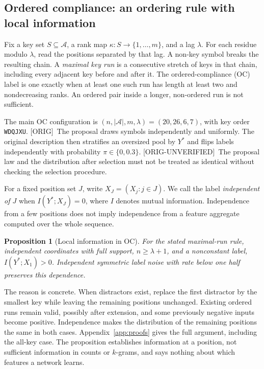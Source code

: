 \documentclass[10pt]{article}
\newcommand{\prov}[1]{{\color{black!65}\scriptsize[#1]}}
\newcommand{\orig}{\prov{ORIG}}
\newcommand{\ou}{\prov{ORIG-UNVERIFIED}}
\newtheorem{proposition}{Proposition}
\begin{document}
\subsection{Ordered compliance: an ordering rule with local information}
Fix a key set $S\subseteq\mathcal A$, a rank map $\kappa:S\to\{1,\ldots,m\}$, and a lag $\lambda$. For each residue modulo $\lambda$, read the positions separated by that lag. A non-key symbol breaks the resulting chain. A \emph{maximal key run} is a consecutive stretch of keys in that chain, including every adjacent key before and after it. The ordered-compliance (OC) label is one exactly when at least one such run has length at least two and nondecreasing ranks. An ordered pair inside a longer, non-ordered run is not sufficient.

The main OC configuration is $(n,|\mathcal A|,m,\lambda)=(20,26,6,7)$, with key order \texttt{WDQJXU}. \orig\ The proposal draws symbols independently and uniformly. The original description then stratifies an oversized pool by $Y^*$ and flips labels independently with probability $\pi\in\{0,0.3\}$. \ou\ The proposal law and the distribution after selection must not be treated as identical without checking the selection procedure.

For a fixed position set $J$, write $X_J=(X_j:j\in J)$. We call the label \emph{independent of $J$} when $I(Y^*;X_J)=0$, where $I$ denotes mutual information. Independence from a few positions does not imply independence from a feature aggregate computed over the whole sequence.

\begin{proposition}[Local information in OC]
\label{prop:oc}
For the stated maximal-run rule, independent coordinates with full support, $n\geq\lambda+1$, and a nonconstant label, $I(Y^*;X_1)>0$. Independent symmetric label noise with rate below one half preserves this dependence.
\end{proposition}
The reason is concrete. When distractors exist, replace the first distractor by the smallest key while leaving the remaining positions unchanged. Existing ordered runs remain valid, possibly after extension, and some previously negative inputs become positive. Independence makes the distribution of the remaining positions the same in both cases. Appendix~\ref{app:proofs} gives the full argument, including the all-key case. The proposition establishes information at a position, not sufficient information in counts or $k$-grams, and says nothing about which features a network learns.
\end{document}
